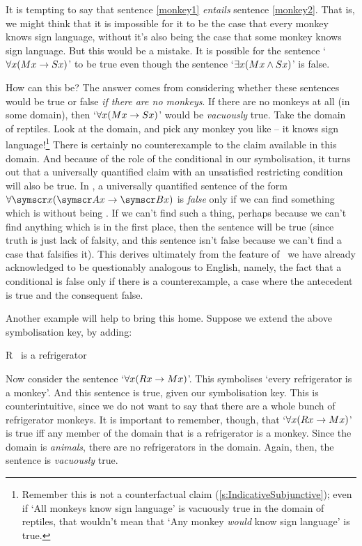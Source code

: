 It is tempting to say that sentence \ref{monkey1} \emph{entails} sentence \ref{monkey2}. That is, we might think that it is impossible for it to be the case that every monkey knows sign language, without it's also being the case that some monkey knows sign language.  But this would be a mistake. It is possible for the sentence `$\forall x(Mx \rightarrow Sx)$' to be true even though the sentence `$\exists x(Mx \wedge Sx)$' is false.

How can this be? The answer comes from considering whether these sentences would be true or false \emph{if there are no monkeys}. If there are no monkeys at all (in some domain), then `$\forall x(Mx \rightarrow Sx)$' would be \emph{vacuously} true. Take the domain of reptiles. Look at the domain, and pick any monkey you like – it knows sign language!\footnote{Remember this is not a counterfactual claim (\ref{s:IndicativeSubjunctive}); even if `All monkeys know sign language' is vacuously true in the domain of reptiles, that wouldn't mean that `Any monkey \emph{would} know sign language' is true.} There is certainly no counterexample to the claim available in this domain. And because of the role of the conditional in our symbolisation, it turns out that a universally quantified claim with an unsatisfied restricting condition will also be true. In \FOL, a universally quantified sentence of the form $\forall \meta{x} (\meta{Ax} \eif \meta{Bx})$ is \emph{false} only if we can find something which is  without being . If we can't find such a thing, perhaps because we can't find anything which is  in the first place, then the sentence will be true (since truth is just lack of falsity, and this sentence isn't false because we can't find a case that falsifies it). This derives ultimately from the feature of \TFL\ we have already acknowledged to be questionably analogous to English, namely, the fact that a conditional is false only if there is a counterexample, a case where the antecedent is true and the consequent false.

Another example will help to bring this home. Suppose we extend the above symbolisation key, by adding:
	\begin{ekey}
		\item[R] \blank\ is a refrigerator
	\end{ekey}
Now consider the sentence `$\forall x(Rx \rightarrow Mx)$'. This symbolises `every refrigerator is a monkey'. And this sentence is true, given our symbolisation key. This is counterintuitive, since we do not want to say that there are a whole bunch of refrigerator monkeys. It is important to remember, though, that `$\forall x(Rx \rightarrow Mx)$' is true iff any member of the domain that is a refrigerator is a monkey. Since the domain is \emph{animals}, there are no refrigerators in the domain. Again, then, the sentence is \emph{vacuously} true. 

